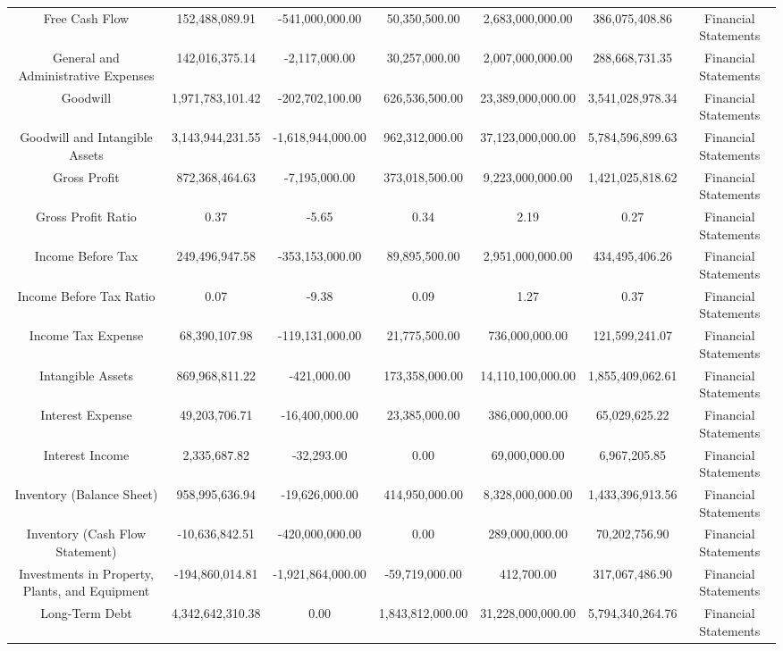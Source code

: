 \begin{longtable}{ccccccc}
Free Cash Flow & 152,488,089.91 & -541,000,000.00 & 50,350,500.00 & 2,683,000,000.00 & 386,075,408.86 & Financial Statements \\
General and Administrative Expenses & 142,016,375.14 & -2,117,000.00 & 30,257,000.00 & 2,007,000,000.00 & 288,668,731.35 & Financial Statements \\
Goodwill & 1,971,783,101.42 & -202,702,100.00 & 626,536,500.00 & 23,389,000,000.00 & 3,541,028,978.34 & Financial Statements \\
Goodwill and Intangible Assets & 3,143,944,231.55 & -1,618,944,000.00 & 962,312,000.00 & 37,123,000,000.00 & 5,784,596,899.63 & Financial Statements \\
Gross Profit & 872,368,464.63 & -7,195,000.00 & 373,018,500.00 & 9,223,000,000.00 & 1,421,025,818.62 & Financial Statements \\
Gross Profit Ratio & 0.37 & -5.65 & 0.34 & 2.19 & 0.27 & Financial Statements \\
Income Before Tax & 249,496,947.58 & -353,153,000.00 & 89,895,500.00 & 2,951,000,000.00 & 434,495,406.26 & Financial Statements \\
Income Before Tax Ratio & 0.07 & -9.38 & 0.09 & 1.27 & 0.37 & Financial Statements \\
Income Tax Expense & 68,390,107.98 & -119,131,000.00 & 21,775,500.00 & 736,000,000.00 & 121,599,241.07 & Financial Statements \\
Intangible Assets & 869,968,811.22 & -421,000.00 & 173,358,000.00 & 14,110,100,000.00 & 1,855,409,062.61 & Financial Statements \\
Interest Expense & 49,203,706.71 & -16,400,000.00 & 23,385,000.00 & 386,000,000.00 & 65,029,625.22 & Financial Statements \\
Interest Income & 2,335,687.82 & -32,293.00 & 0.00 & 69,000,000.00 & 6,967,205.85 & Financial Statements \\
Inventory (Balance Sheet) & 958,995,636.94 & -19,626,000.00 & 414,950,000.00 & 8,328,000,000.00 & 1,433,396,913.56 & Financial Statements \\
Inventory (Cash Flow Statement) & -10,636,842.51 & -420,000,000.00 & 0.00 & 289,000,000.00 & 70,202,756.90 & Financial Statements \\
Investments in Property, Plants, and Equipment & -194,860,014.81 & -1,921,864,000.00 & -59,719,000.00 & 412,700.00 & 317,067,486.90 & Financial Statements \\
Long-Term Debt & 4,342,642,310.38 & 0.00 & 1,843,812,000.00 & 31,228,000,000.00 & 5,794,340,264.76 & Financial Statements \\

\end{longtable}
